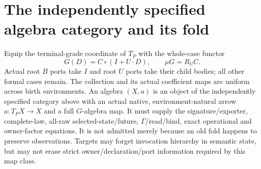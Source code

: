 \documentclass[11pt]{article}
\begin{document}
\section{The independently specified algebra category and its fold}
Equip the terminal-grade coordinate of $T_P$ with the whole-case functor
\[
                 G(D)=C\circ(I+U\cdot D),\qquad \mu G=R_U C.     \tag{1}
\]
Actual root $B$ ports take $I$ and root $U$ ports take their child bodies; all other formal cases remain. The collection and its actual coefficient maps are uniform across birth environments. An algebra $(X,a)$ is an object of the independently specified category above with an actual native, environment-natural arrow $a:T_PX\to X$ and a full $G$-algebra map. It must supply the signature/exporter, complete-law, all-raw selected-state/future, $\Gamma$/read/bind, exact operational and owner-factor equations. It is not admitted merely because an old fold happens to preserve observations. Targets may forget invocation hierarchy in semantic state, but may not erase strict owner/declaration/port information required by this map class.
\end{document}

